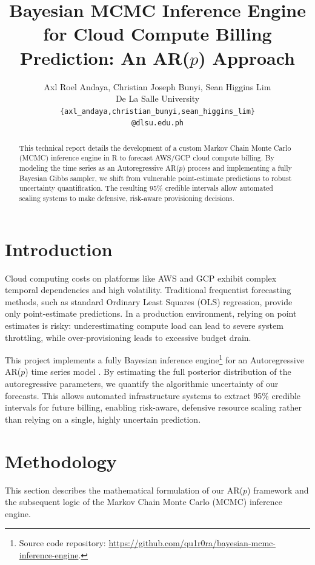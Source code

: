 \documentclass{article}
\title{Bayesian MCMC Inference Engine for Cloud Compute Billing Prediction: An AR($p$) Approach}
\author{
    Axl Roel Andaya, Christian Joseph Bunyi, Sean Higgins Lim \\
    De La Salle University \\
    \texttt{\{axl\_andaya,christian\_bunyi,sean\_higgins\_lim\}} \\ \texttt{@dlsu.edu.ph}
}
\date{}
\begin{document}
\maketitle

\begin{abstract}
This technical report details the development of a custom Markov Chain Monte Carlo (MCMC) inference engine in R \cite{rproject} to forecast AWS/GCP cloud compute billing. By modeling the time series as an Autoregressive AR($p$) process and implementing a fully Bayesian Gibbs sampler, we shift from vulnerable point-estimate predictions to robust uncertainty quantification. The resulting 95\% credible intervals allow automated scaling systems to make defensive, risk-aware provisioning decisions.
\end{abstract}


\section{Introduction}
Cloud computing costs on platforms like AWS and GCP exhibit complex temporal dependencies and high volatility. Traditional frequentist forecasting methods, such as standard Ordinary Least Squares (OLS) regression, provide only point-estimate predictions. In a production environment, relying on point estimates is risky: underestimating compute load can lead to severe system throttling, while over-provisioning leads to excessive budget drain.

This project implements a fully Bayesian inference engine\footnote{Source code repository: \url{https://github.com/qu1r0ra/bayesian-mcmc-inference-engine}.} for an Autoregressive AR($p$) time series model \cite{box2015time}. By estimating the full posterior distribution of the autoregressive parameters, we quantify the algorithmic uncertainty of our forecasts. This allows automated infrastructure systems to extract 95\% credible intervals for future billing, enabling risk-aware, defensive resource scaling rather than relying on a single, highly uncertain prediction.

\section{Methodology}
This section describes the mathematical formulation of our AR($p$) framework and the subsequent logic of the Markov Chain Monte Carlo (MCMC) inference engine.
\end{document}
